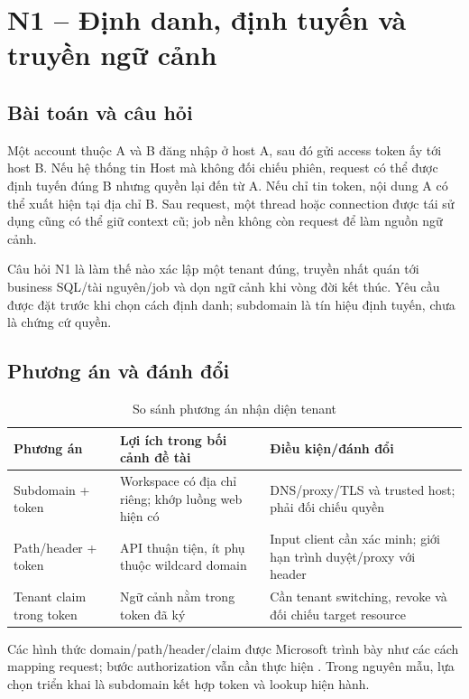\section{N1 -- Định danh, định tuyến và truyền ngữ cảnh}\label{sec:n1}
\subsection{Bài toán và câu hỏi}
Một account thuộc A và B đăng nhập ở host A, sau đó gửi access token ấy tới host B. Nếu hệ thống tin Host mà không đối chiếu phiên, request có thể được định tuyến đúng B nhưng quyền lại đến từ A. Nếu chỉ tin token, nội dung A có thể xuất hiện tại địa chỉ B. Sau request, một thread hoặc connection được tái sử dụng cũng có thể giữ context cũ; job nền không còn request để làm nguồn ngữ cảnh.

Câu hỏi N1 là làm thế nào xác lập một tenant đúng, truyền nhất quán tới business SQL\slash tài nguyên\slash job và dọn ngữ cảnh khi vòng đời kết thúc. Yêu cầu được đặt trước khi chọn cách định danh; subdomain là tín hiệu định tuyến, chưa là chứng cứ quyền.

\subsection{Phương án và đánh đổi}
\begin{table}[htbp]
\centering\caption{So sánh phương án nhận diện tenant}\label{tab:n1-options}
\begin{tabularx}{\textwidth}{P{.24\textwidth}XX}
\toprule Phương án & Lợi ích trong bối cảnh đề tài & Điều kiện\slash đánh đổi \\
\midrule
Subdomain + token & Workspace có địa chỉ riêng; khớp luồng web hiện có & DNS\slash proxy\slash TLS và trusted host; phải đối chiếu quyền \\
Path\slash header + token & API thuận tiện, ít phụ thuộc wildcard domain & Input client cần xác minh; giới hạn trình duyệt\slash proxy với header \\
Tenant claim trong token & Ngữ cảnh nằm trong token đã ký & Cần tenant switching, revoke và đối chiếu target resource \\
\bottomrule\end{tabularx}
\end{table}
Các hình thức domain\slash path\slash header\slash claim được Microsoft trình bày như các cách mapping request; bước authorization vẫn cần thực hiện \citep{azureTenantMapping}. Trong nguyên mẫu, lựa chọn triển khai là subdomain kết hợp token và lookup hiện hành.

